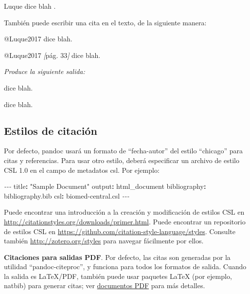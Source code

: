 \documentclass[12pt,a4paper,oneside,]{book}
\newenvironment{Shaded}{\begin{snugshade}}{\end{snugshade}}
\newcommand{\AttributeTok}[1]{\textcolor[rgb]{0.77,0.63,0.00}{#1}}
\newcommand{\CommentTok}[1]{\textcolor[rgb]{0.56,0.35,0.01}{\textit{#1}}}
\newcommand{\FunctionTok}[1]{\textcolor[rgb]{0.00,0.00,0.00}{#1}}
\newcommand{\KeywordTok}[1]{\textcolor[rgb]{0.13,0.29,0.53}{\textbf{#1}}}
\newcommand{\NormalTok}[1]{#1}
\newcommand{\OtherTok}[1]{\textcolor[rgb]{0.56,0.35,0.01}{#1}}
\newcommand{\PreprocessorTok}[1]{\textcolor[rgb]{0.56,0.35,0.01}{\textit{#1}}}
\newcommand{\StringTok}[1]{\textcolor[rgb]{0.31,0.60,0.02}{#1}}
\numberwithin{dummy}{section}
\theoremstyle{ocrenumbox}
\theoremstyle{blacknumex}
\theoremstyle{blacknumbox}
\theoremstyle{ocrenum}
\theoremstyle{ocrenum}
\begin{document}
Luque dice blah \citeyearpar{Luque2017}.

También puede escribir una cita en el texto, de la siguiente manera:

\begin{Shaded}
\begin{Highlighting}[]
\NormalTok{@Luque2017 dice blah.}

\NormalTok{@Luque2017 }\CommentTok{[}\OtherTok{pág. 33}\CommentTok{]}\NormalTok{ dice blah.}
\end{Highlighting}
\end{Shaded}

\emph{Produce la siguiente salida:}

\citet{Luque2017} dice blah.

\citet[pág. 33]{Luque2017} dice blah.

\hypertarget{estilos-de-citaciuxf3n}{%
\subsection{Estilos de citación}\label{estilos-de-citaciuxf3n}}

Por defecto, pandoc usará un formato de ``fecha-autor'' del estilo
``chicago'' para citas y referencias. Para usar otro estilo, deberá
especificar un archivo de estilo CSL 1.0 en el campo de metadatos csl.
Por ejemplo:

\begin{Shaded}
\begin{Highlighting}[]
\PreprocessorTok{{-}{-}{-}}
\FunctionTok{title}\KeywordTok{:}\AttributeTok{ }\StringTok{"Sample Document"}
\FunctionTok{output}\KeywordTok{:}\AttributeTok{ html\_document}
\FunctionTok{bibliography}\KeywordTok{:}\AttributeTok{ bibliography.bib}
\FunctionTok{csl}\KeywordTok{:}\AttributeTok{ biomed{-}central.csl}
\PreprocessorTok{{-}{-}{-}}
\end{Highlighting}
\end{Shaded}

Puede encontrar una introducción a la creación y modificación de estilos
CSL en \url{http://citationstyles.org/downloads/primer.html}. Puede
encontrar un repositorio de estilos CSL en
\url{https://github.com/citation-style-language/styles}. Consulte
también \url{http://zotero.org/styles} para navegar fácilmente por
ellos.

\textbf{Citaciones para salidas PDF}. Por defecto, las citas son
generadas por la utilidad ``pandoc-citeproc'', y funciona para todos los
formatos de salida. Cuando la salida es LaTeX/PDF, también puede usar
paquetes LaTeX (por ejemplo, natbib) para generar citas; ver
\href{https://bookdown.org/yihui/rmarkdown/pdf-document.html}{documentos
PDF} para más detalles.
\end{document}
